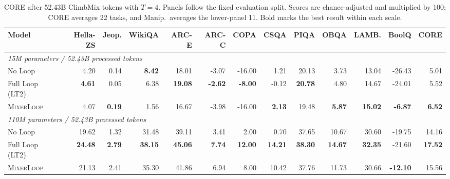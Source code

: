 \documentclass{article}
\newcommand{\method}{\textsc{MixerLoop}}
\begin{document}
\begin{table}[t]
\centering
\footnotesize
\setlength{\tabcolsep}{2.3pt}
\caption{CORE after 52.43B ClimbMix tokens with $T=4$. Panels follow the fixed
evaluation split. Scores are chance-adjusted and multiplied by 100; CORE
averages 22 tasks, and Manip.\ averages the lower-panel 11. Bold marks the best
result within each scale.}
\label{tab:core_main}
\begin{tabular}{lrrrrrrrrrrrr}
\toprule
Model
& Hella-ZS & Jeop. & WikiQA & ARC-E & ARC-C
& COPA & CSQA & PIQA & OBQA & LAMB. & BoolQ & CORE \\
\midrule
\multicolumn{13}{l}{\textit{15M parameters / 52.43B processed tokens}} \\
No Loop
& 4.20 & 0.14 & \textbf{8.42} & 18.01 & -3.07
& -16.00 & 1.21 & 20.13 & 3.73 & 13.04 & -26.43 & 5.01 \\
Full Loop (LT2)
& \textbf{4.61} & 0.05 & 6.38 & \textbf{19.08} & \textbf{-2.62}
& \textbf{-8.00} & -0.12 & \textbf{20.78} & 4.80 & 14.67 & -24.01 & 5.52 \\
\method{}
& 4.07 & \textbf{0.19} & 1.56 & 16.67 & -3.98
& -16.00 & \textbf{2.13} & 19.48 & \textbf{5.87} & \textbf{15.02} & \textbf{-6.87} & \textbf{6.52} \\
\midrule
\multicolumn{13}{l}{\textit{110M parameters / 52.43B processed tokens}} \\
No Loop
& 19.62 & 1.32 & 31.48 & 39.11 & 3.41
& 2.00 & 0.70 & 37.65 & 10.67 & 30.60 & -19.75 & 14.16 \\
Full Loop (LT2)
& \textbf{24.48} & \textbf{2.79} & \textbf{38.15} & \textbf{45.06} & \textbf{7.74}
& \textbf{12.00} & \textbf{14.21} & \textbf{38.30} & \textbf{14.67} & \textbf{32.35} & -21.60 & \textbf{17.52} \\
\method{}
& 21.13 & 2.41 & 35.30 & 41.86 & 6.94
& 8.00 & 10.42 & 37.76 & 11.73 & 30.66 & \textbf{-12.10} & 15.56 \\
\bottomrule
\end{tabular}

\vspace{4pt}


\end{table}
\end{document}
